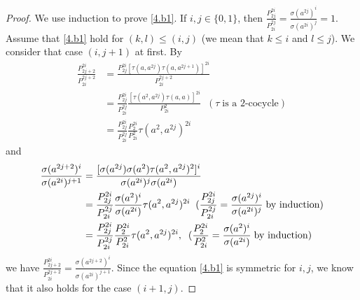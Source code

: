 \documentclass[a4paper,11pt]{amsart}
\numberwithin{equation}{section}
\begin{document}
\begin{proof}
We use induction to prove \eqref{4.b1}. If $i,j\in \{0,1\}$, then $\frac{P_{2j}^{2i}}{P_{2i}^{2j}}=\frac{\sigma(a^{2j})^{i}}{\sigma(a^{2i})^{j}}=1$. Assume that \eqref{4.b1} hold for $(k,l)\leq (i,j)$ (we mean that $k\leq i$ and $l\leq j$). We consider that case $(i,j+1)$ at first. By
\begin{align*}
\frac{P_{2j+2}^{2i}}{P_{2i}^{2j+2}}&=\frac{P_{2j}^{2i}[\tau(a,a^{2j})\tau(a,a^{2j+1})]^{2i}}{P_{2i}^{2j+2}}\\
                &=\frac{P_{2j}^{2i}}{P_{2i}^{2j}} \frac{[\tau(a^2,a^{2j})\tau(a,a)]^{2i}}{P_{2i}^{2}}\;\;(\tau \;\text{is a 2-cocycle})\\
                &=\frac{P_{2j}^{2i}}{P_{2i}^{2j}} \frac{P_2^{2i}}{P_{2i}^2} \tau(a^2,a^{2j})^{2i}
\end{align*}
and
\begin{align*}
\frac{\sigma(a^{2j+2})^i} {\sigma(a^{2i})^{j+1}}&=\frac{[\sigma(a^{2j}) \sigma(a^2) \tau(a^2,a^{2j})^2]^{i}}{\sigma(a^{2i})^j\sigma(a^{2i})}\\
                &=\frac{P_{2j}^{2i}}{P_{2i}^{2j}} \frac{\sigma(a^2)^i}{\sigma(a^{2i})} \tau(a^2,a^{2j})^{2i}\;\;(\frac{P_{2j}^{2i}}{P_{2i}^{2j}}=\frac{\sigma(a^{2j})^{i}}{\sigma(a^{2i})^{j}} \text{\;by induction})\\
                &=\frac{P_{2j}^{2i}}{P_{2i}^{2j}} \frac{P_2^{2i}}{P_{2i}^2}
                 \tau(a^2,a^{2j})^{2i}, \;\;(\frac{P_{2}^{2i}}{P_{2i}^{2}}=\frac{\sigma(a^{2})^{i}}{\sigma(a^{2i})} \text{\;by induction})
\end{align*}
we have $\frac{P_{2j+2}^{2i}}{P_{2i}^{2j+2}}=\frac{\sigma(a^{2j+2})^i} {\sigma(a^{2i})^{j+1}}.$ Since the equation \eqref{4.b1} is symmetric for $i,j$, we know that it also holds for the case $(i+1,j)$.


\end{proof}
\end{document}
